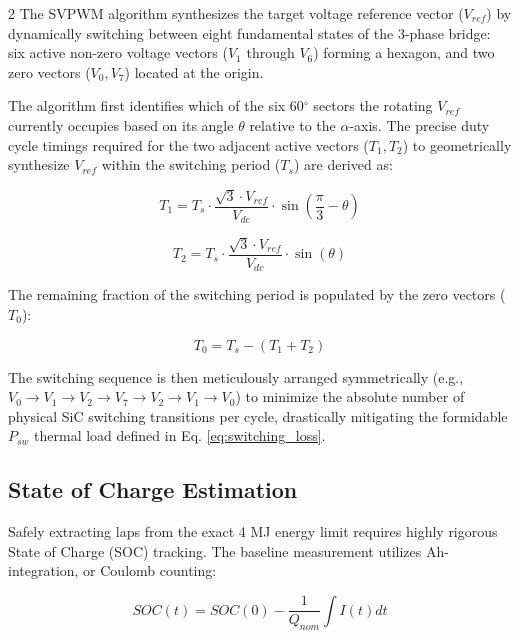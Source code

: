 \begin{multicols}{2}
The SVPWM algorithm synthesizes the target voltage reference vector ($V_{ref}$) by dynamically switching between eight fundamental states of the 3-phase bridge: six active non-zero voltage vectors ($V_1$ through $V_6$) forming a hexagon, and two zero vectors ($V_0, V_7$) located at the origin. 

The algorithm first identifies which of the six 60$^\circ$ sectors the rotating $V_{ref}$ currently occupies based on its angle $\theta$ relative to the $\alpha$-axis. The precise duty cycle timings required for the two adjacent active vectors ($T_1, T_2$) to geometrically synthesize $V_{ref}$ within the switching period ($T_s$) are derived as:

\begin{equation} \label{eq:svpwm_t1}
T_1 = T_s \cdot \frac{\sqrt{3} \cdot V_{ref}}{V_{dc}} \cdot \sin\left(\frac{\pi}{3} - \theta\right)
\end{equation}

\begin{equation} \label{eq:svpwm_t2}
T_2 = T_s \cdot \frac{\sqrt{3} \cdot V_{ref}}{V_{dc}} \cdot \sin(\theta)
\end{equation}

The remaining fraction of the switching period is populated by the zero vectors ($T_0$):

\begin{equation} \label{eq:svpwm_t0}
T_0 = T_s - (T_1 + T_2)
\end{equation}

The switching sequence is then meticulously arranged symmetrically (e.g., $V_0 \rightarrow V_1 \rightarrow V_2 \rightarrow V_7 \rightarrow V_2 \rightarrow V_1 \rightarrow V_0$) to minimize the absolute number of physical SiC switching transitions per cycle, drastically mitigating the formidable $P_{sw}$ thermal load defined in Eq. \ref{eq:switching_loss}.

\subsection{State of Charge Estimation}

Safely extracting laps from the exact 4 MJ energy limit requires highly rigorous State of Charge (SOC) tracking. The baseline measurement utilizes Ah-integration, or Coulomb counting:

\begin{equation} \label{eq:coulomb_counting}
SOC(t) = SOC(0) - \frac{1}{Q_{nom}} \int I(t)dt
\end{equation}


\end{multicols}

